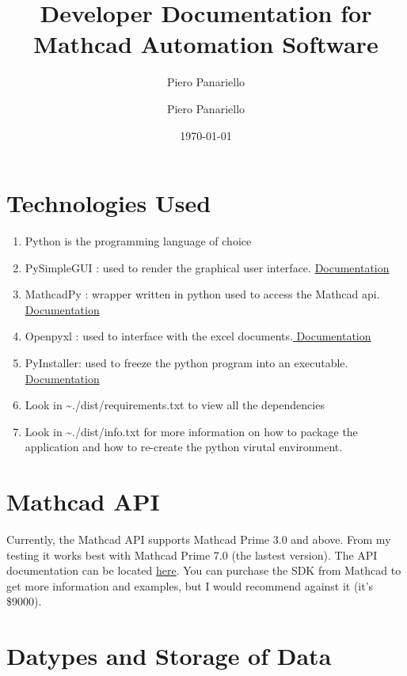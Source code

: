 \documentclass[11pt]{article}
\author{Piero Panariello}
\author{Piero Panariello}
\date{\today}
\title{Developer Documentation for Mathcad Automation Software}
\begin{document}
\maketitle
\tableofcontents


\section{Technologies Used}
\label{sec:org9c791f4}
\begin{enumerate}
\item Python is the programming language of choice
\item PySimpleGUI : used to render the graphical user interface. \href{https://pysimplegui.readthedocs.io/en/latest/}{Documentation}
\item MathcadPy : wrapper written in python used to access the Mathcad api. \href{https://github.com/MattWoodhead/MathcadPy/blob/master/MathcadPy/\_application.py}{Documentation}
\item Openpyxl : used to interface with the excel documents.\href{https://openpyxl.readthedocs.io/en/stable/}{ Documentation}
\item PyInstaller: used to freeze the python program into an executable.\href{https://pyinstaller.readthedocs.io/en/stable/}{ Documentation}
\item Look in \textasciitilde{}./dist/requirements.txt to view all the dependencies
\item Look in \textasciitilde{}./dist/info.txt for more information on how to package the application and how to re-create the python virutal environment.
\end{enumerate}

\section{Mathcad API}
\label{sec:org8009997}
Currently, the Mathcad API supports Mathcad Prime 3.0 and above. From my testing it works best with Mathcad Prime 7.0 (the lastest version). The API documentation can be located \href{https://support.ptc.com/help/mathcad/r7.0/en/index.html\#page/PTC\_Mathcad\_Help\%2Fmathcad\_and\_automation\_api.html\%23}{here}. You can purchase the SDK from Mathcad to get more information and examples, but I would recommend against it (it's \$9000).
\section{Datypes and Storage of Data}
\label{sec:orga595035}
\end{document}
